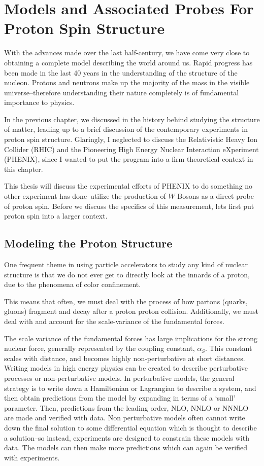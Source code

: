 \chapter{Models and Associated Probes For Proton Spin Structure}
\label{ch:modeling_proton_spin}

With the advances made over the last half-century, we have come very close to
obtaining a complete model describing the world around us.  Rapid progress has
been made in the last 40 years in the understanding of the structure of the
nucleon. Protons and neutrons make up the majority of the mass in the visible
universe--therefore understanding their nature completely is of fundamental
importance to physics.

In the previous chapter, we discussed in the history behind studying the
structure of matter, leading up to a brief discussion of the contemporary
experiments in proton spin structure. Glaringly, I neglected to discuss the
Relativistic Heavy Ion Collider (RHIC) and the Pioneering High Energy Nuclear
Interaction eXperiment (PHENIX), since I wanted to put the program into a firm
theoretical context in this chapter.

This thesis will discuss the experimental efforts of PHENIX to do something no
other experiment has done--utilize the production of $W$ Bosons as a direct probe
of proton spin. Before we discuss the specifics of this measurement, lets first
put proton spin into a larger context.

\section{Modeling the Proton Structure}

One frequent theme in using particle accelerators to study any kind of nuclear
structure is that we do not ever get to directly look at the innards of a
proton, due to the phenomena of color confinement.

This means that often, we must deal with the process of how partons (quarks,
gluons) fragment and decay after a proton proton collision. Additionally, we
must deal with and account for the scale-variance of the fundamental forces. 

The scale variance of the fundamental forces has large implications for the
strong nuclear force, generally represented by the coupling constant,
$\alpha_S$. This constant scales with distance, and becomes highly
non-perturbative at short distances. Writing models in high energy physics can
be created to describe perturbative processes or non-perturbative models.  In
perturbative models, the general strategy is to write down a Hamiltonian or
Lagrangian to describe a system, and then obtain predictions from the model by
expanding in terms of a `small' parameter. Then, predictions from the leading
order, NLO, NNLO or NNNLO are made and verified with data. Non perturbative
models often cannot write down the final solution to some differential equation
which is thought to describe a solution--so instead, experiments are designed
to constrain these models with data. The models can then make more predictions
which can again be verified with experiments. 

